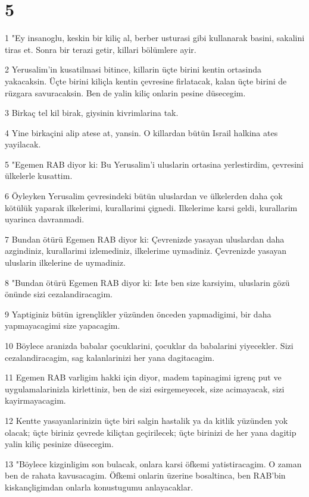 \chapter{5}

\par 1 "Ey insanoglu, keskin bir kiliç al, berber usturasi gibi kullanarak basini, sakalini tiras et. Sonra bir terazi getir, killari bölümlere ayir.
\par 2 Yerusalim'in kusatilmasi bitince, killarin üçte birini kentin ortasinda yakacaksin. Üçte birini kiliçla kentin çevresine firlatacak, kalan üçte birini de rüzgara savuracaksin. Ben de yalin kiliç onlarin pesine düsecegim.
\par 3 Birkaç tel kil birak, giysinin kivrimlarina tak.
\par 4 Yine birkaçini alip atese at, yansin. O killardan bütün Israil halkina ates yayilacak.
\par 5 "Egemen RAB diyor ki: Bu Yerusalim'i uluslarin ortasina yerlestirdim, çevresini ülkelerle kusattim.
\par 6 Öyleyken Yerusalim çevresindeki bütün uluslardan ve ülkelerden daha çok kötülük yaparak ilkelerimi, kurallarimi çignedi. Ilkelerime karsi geldi, kurallarim uyarinca davranmadi.
\par 7 Bundan ötürü Egemen RAB diyor ki: Çevrenizde yasayan uluslardan daha azgindiniz, kurallarimi izlemediniz, ilkelerime uymadiniz. Çevrenizde yasayan uluslarin ilkelerine de uymadiniz.
\par 8 "Bundan ötürü Egemen RAB diyor ki: Iste ben size karsiyim, uluslarin gözü önünde sizi cezalandiracagim.
\par 9 Yaptiginiz bütün igrençlikler yüzünden önceden yapmadigimi, bir daha yapmayacagimi size yapacagim.
\par 10 Böylece aranizda babalar çocuklarini, çocuklar da babalarini yiyecekler. Sizi cezalandiracagim, sag kalanlarinizi her yana dagitacagim.
\par 11 Egemen RAB varligim hakki için diyor, madem tapinagimi igrenç put ve uygulamalarinizla kirlettiniz, ben de sizi esirgemeyecek, size acimayacak, sizi kayirmayacagim.
\par 12 Kentte yasayanlarinizin üçte biri salgin hastalik ya da kitlik yüzünden yok olacak; üçte biriniz çevrede kiliçtan geçirilecek; üçte birinizi de her yana dagitip yalin kiliç pesinize düsecegim.
\par 13 "Böylece kizginligim son bulacak, onlara karsi öfkemi yatistiracagim. O zaman ben de rahata kavusacagim. Öfkemi onlarin üzerine bosaltinca, ben RAB'bin kiskançligimdan onlarla konustugumu anlayacaklar.
